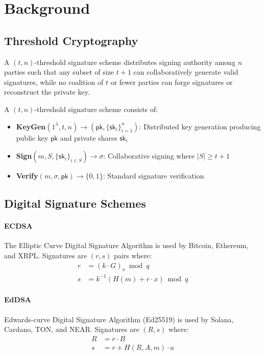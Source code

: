 \section{Background}


\subsection{Threshold Cryptography}

A $(t,n)$-threshold signature scheme distributes signing authority among $n$ parties such that any subset of size $t+1$ can collaboratively generate valid signatures, while no coalition of $t$ or fewer parties can forge signatures or reconstruct the private key.

\begin{definition}
A $(t,n)$-threshold signature scheme consists of:
\begin{itemize}
\item \textbf{KeyGen}$(1^\lambda, t, n) \to (\textsf{pk}, \{\textsf{sk}_i\}_{i=1}^n)$: Distributed key generation producing public key $\textsf{pk}$ and private shares $\textsf{sk}_i$
\item \textbf{Sign}$(m, S, \{\textsf{sk}_i\}_{i \in S}) \to \sigma$: Collaborative signing where $|S| \geq t+1$
\item \textbf{Verify}$(m, \sigma, \textsf{pk}) \to \{0,1\}$: Standard signature verification
\end{itemize}
\end{definition}

\subsection{Digital Signature Schemes}

\paragraph{ECDSA} The Elliptic Curve Digital Signature Algorithm is used by Bitcoin, Ethereum, and XRPL. Signatures are $(r,s)$ pairs where:
\begin{align*}
r &= (k \cdot G)_x \bmod q \\
s &= k^{-1}(H(m) + r \cdot x) \bmod q
\end{align*}

\paragraph{EdDSA} Edwards-curve Digital Signature Algorithm (Ed25519) is used by Solana, Cardano, TON, and NEAR. Signatures are $(R, s)$ where:
\begin{align*}
R &= r \cdot B \\
s &= r + H(R, A, m) \cdot a
\end{align*}

